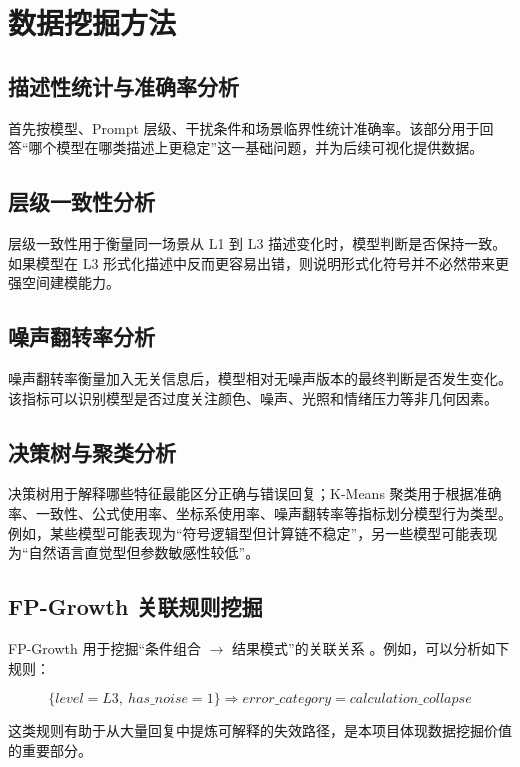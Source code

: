 
\chapter{数据挖掘方法}

\section{描述性统计与准确率分析}

首先按模型、Prompt 层级、干扰条件和场景临界性统计准确率。该部分用于回答“哪个模型在哪类描述上更稳定”这一基础问题，并为后续可视化提供数据。

\section{层级一致性分析}

层级一致性用于衡量同一场景从 L1 到 L3 描述变化时，模型判断是否保持一致。如果模型在 L3 形式化描述中反而更容易出错，则说明形式化符号并不必然带来更强空间建模能力。

\section{噪声翻转率分析}

噪声翻转率衡量加入无关信息后，模型相对无噪声版本的最终判断是否发生变化。该指标可以识别模型是否过度关注颜色、噪声、光照和情绪压力等非几何因素。

\section{决策树与聚类分析}

决策树用于解释哪些特征最能区分正确与错误回复；K-Means 聚类用于根据准确率、一致性、公式使用率、坐标系使用率、噪声翻转率等指标划分模型行为类型。例如，某些模型可能表现为“符号逻辑型但计算链不稳定”，另一些模型可能表现为“自然语言直觉型但参数敏感性较低”。

\section{FP-Growth 关联规则挖掘}

FP-Growth 用于挖掘“条件组合 $\rightarrow$ 结果模式”的关联关系 \cite{han2000mining}。例如，可以分析如下规则：

\begin{equation}
\{level=L3,\ has\_noise=1\} \Rightarrow error\_category=calculation\_collapse
\label{eq:rule}
\end{equation}

这类规则有助于从大量回复中提炼可解释的失效路径，是本项目体现数据挖掘价值的重要部分。
